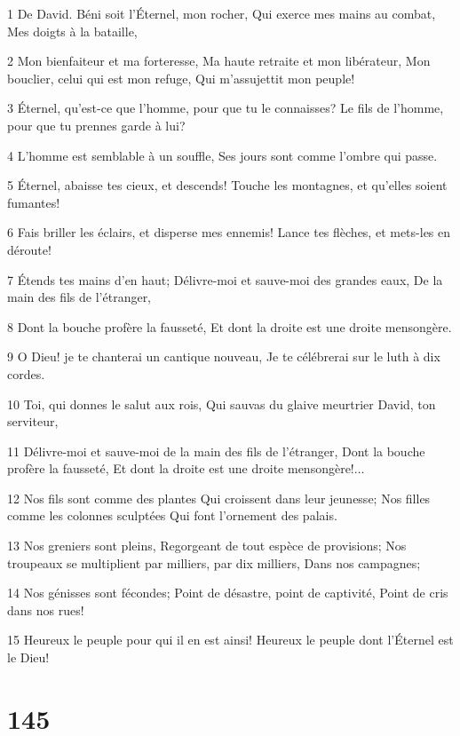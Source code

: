 \par 1 De David. Béni soit l'Éternel, mon rocher, Qui exerce mes mains au combat, Mes doigts à la bataille,
\par 2 Mon bienfaiteur et ma forteresse, Ma haute retraite et mon libérateur, Mon bouclier, celui qui est mon refuge, Qui m'assujettit mon peuple!
\par 3 Éternel, qu'est-ce que l'homme, pour que tu le connaisses? Le fils de l'homme, pour que tu prennes garde à lui?
\par 4 L'homme est semblable à un souffle, Ses jours sont comme l'ombre qui passe.
\par 5 Éternel, abaisse tes cieux, et descends! Touche les montagnes, et qu'elles soient fumantes!
\par 6 Fais briller les éclairs, et disperse mes ennemis! Lance tes flèches, et mets-les en déroute!
\par 7 Étends tes mains d'en haut; Délivre-moi et sauve-moi des grandes eaux, De la main des fils de l'étranger,
\par 8 Dont la bouche profère la fausseté, Et dont la droite est une droite mensongère.
\par 9 O Dieu! je te chanterai un cantique nouveau, Je te célébrerai sur le luth à dix cordes.
\par 10 Toi, qui donnes le salut aux rois, Qui sauvas du glaive meurtrier David, ton serviteur,
\par 11 Délivre-moi et sauve-moi de la main des fils de l'étranger, Dont la bouche profère la fausseté, Et dont la droite est une droite mensongère!...
\par 12 Nos fils sont comme des plantes Qui croissent dans leur jeunesse; Nos filles comme les colonnes sculptées Qui font l'ornement des palais.
\par 13 Nos greniers sont pleins, Regorgeant de tout espèce de provisions; Nos troupeaux se multiplient par milliers, par dix milliers, Dans nos campagnes;
\par 14 Nos génisses sont fécondes; Point de désastre, point de captivité, Point de cris dans nos rues!
\par 15 Heureux le peuple pour qui il en est ainsi! Heureux le peuple dont l'Éternel est le Dieu!

\chapter{145}

